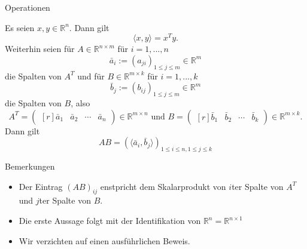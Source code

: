 \documentclass[
  8pt,
  ignorenonframetext,
]{beamer}
\providecommand{\tightlist}{%
  \setlength{\itemsep}{0pt}\setlength{\parskip}{0pt}}
\begin{document}
\begin{frame}{Operationen}
\protect\hypertarget{operationen-20}{}
\footnotesize
\begin{theorem}
\normalfont
\justifying
Es seien $x,y \in \mathbb{R}^n$. Dann gilt
\begin{equation}
\langle x,y \rangle = x^Ty.
\end{equation}
Weiterhin seien für $A \in \mathbb{R}^{n\times m}$ für $i = 1,...,n$
\begin{equation}
\bar{a}_i := (a_{ji})_{1 \le j \le m} \in \mathbb{R}^m
\end{equation}
die Spalten von $A^T$ und für $B \in \mathbb{R}^{m \times k}$ für $i = 1,...,k$
\begin{equation}
\bar{b}_j := (b_{ij})_{1 \le j \le m} \in \mathbb{R}^m
\end{equation}
die Spalten von $B$, also
\begin{equation}
A^T =
\begin{pmatrix*}[r]
\bar{a}_1 & \bar{a}_2 & \cdots & \bar{a}_n
\end{pmatrix*}
\in \mathbb{R}^{m \times n}
\mbox{ und }
B =
\begin{pmatrix*}[r]
\bar{b}_1 & \bar{b}_2 & \cdots & \bar{b}_k
\end{pmatrix*}
\in \mathbb{R}^{m \times k}.
\end{equation}
Dann gilt
\begin{equation}
AB = \left(\langle \bar{a}_i,\bar{b}_j \rangle \right)_{1 \le i \le n, 1 \le j \le k}
\end{equation}
\end{theorem}

\footnotesize

Bemerkungen

\begin{itemize}
\tightlist
\item
  Der Eintrag \((AB)_{ij}\) enstpricht dem Skalarprodukt von \(i\)ter
  Spalte von \(A^T\) und \(j\)ter Spalte von \(B\).
\item
  Die erste Aussage folgt mit der Identifikation von
  \(\mathbb{R}^{n} = \mathbb{R}^{n \times 1}\)
\item
  Wir verzichten auf einen ausführlichen Beweis.
\end{itemize}
\end{frame}
\end{document}
